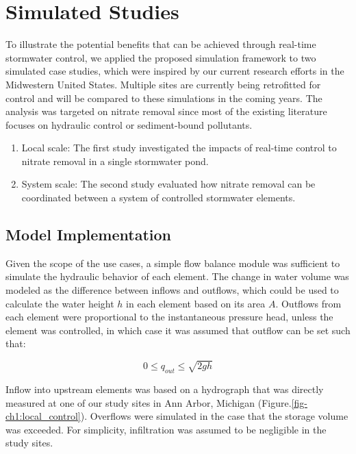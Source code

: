 

\section{Simulated Studies}

To illustrate the potential benefits that can be achieved through real-time stormwater control, we applied the proposed simulation framework to two simulated case studies, which were inspired by our current research efforts in the Midwestern United States.
Multiple sites are currently being retrofitted for control  and will be compared to these simulations in the coming years.
The analysis was targeted on nitrate removal since most of the existing literature focuses on hydraulic control or sediment-bound pollutants.

\begin{enumerate}
	\item  Local scale: The first study investigated the impacts of real-time control to nitrate removal in a single stormwater pond.
    \item System scale: The second study evaluated how nitrate removal can be coordinated between a system of controlled stormwater elements.
\end{enumerate}

\subsection{Model Implementation}
Given the scope of the use cases, a simple flow balance module was sufficient to simulate the hydraulic behavior of each element. The change in water volume was modeled as the difference between inflows and outflows, which could be used to calculate the water height $h$ in each element based on its area $A$. Outflows from each element were proportional to the instantaneous pressure head, unless the element was controlled, in which case it was assumed that outflow can be set such that:

\begin{equation} \label{outflow}
 0 \leq  q_{out}  \leq \sqrt{2  g  h}
\end{equation}

Inflow into upstream elements was based on a hydrograph  that was directly measured at one of our study sites in Ann Arbor, Michigan (Figure.\ref{fig-ch1:local_control}). Overflows were simulated in the case that the storage volume was exceeded. For simplicity, infiltration was assumed to be negligible in the study sites. 

